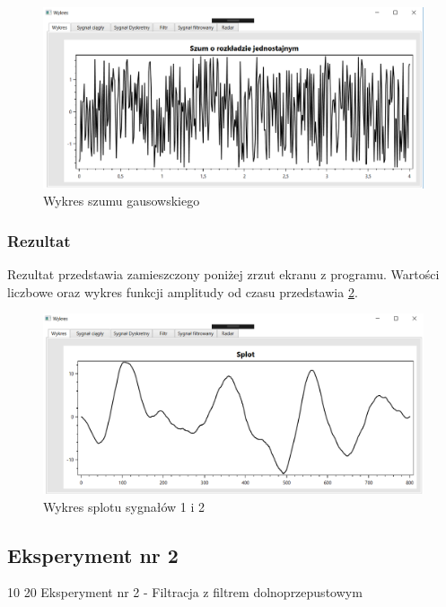 \documentclass[12pt]{article}
\begin{document}
\begin{figure}[h!]
 \centering
 \includegraphics[width=12.3cm]{szum.PNG}
 \vspace{-0.3cm}
 \caption{Wykres szumu gausowskiego}
 \label{szum}
\end{figure}
 \newpage
\subsubsection{Rezultat}

Rezultat przedstawia zamieszczony poniżej zrzut ekranu z programu. Wartości liczbowe oraz wykres funkcji amplitudy od czasu przedstawia \ref{Wykres dla wynikw eksperymentu pierwszego}.
\begin{figure}[h!]
 \centering
 \includegraphics[width=12.3cm]{splot.PNG}
 \vspace{-0.3cm}
 \caption{Wykres splotu sygnałów 1 i 2}
 \label{Wykres dla wynikw eksperymentu pierwszego}
\end{figure}



\subsection{Eksperyment nr 2}
10 20
Eksperyment nr 2  - Filtracja z filtrem dolnoprzepustowym
\end{document}
